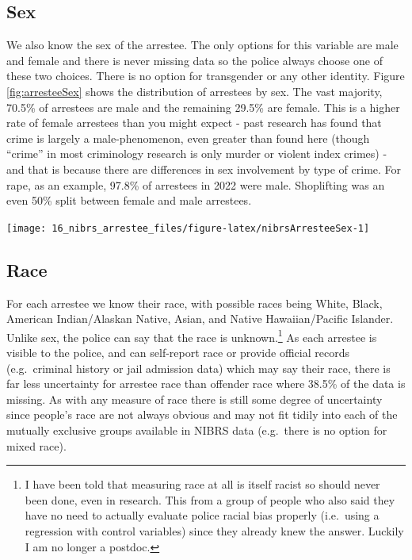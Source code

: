\documentclass[
]{krantz}
\let\origfigure\figure
\let\endorigfigure\endfigure
\renewenvironment{figure}[1][2] {
    \expandafter\origfigure\expandafter[H]
} {
    \endorigfigure
}
\begin{document}
\subsection{Sex}\label{sex-3}

We also know the sex of the arrestee. The only options for
this variable are male and female and there is never missing
data so the police always choose one of these two choices.
There is no option for transgender or any other identity.
Figure \ref{fig:arresteeSex} shows the distribution of
arrestees by sex. The vast majority, 70.5\% of arrestees are
male and the remaining 29.5\% are female. This is a higher
rate of female arrestees than you might expect - past
research has found that crime is largely a male-phenomenon,
even greater than found here (though ``crime'' in most
criminology research is only murder or violent index crimes)
- and that is because there are differences in sex
involvement by type of crime. For rape, as an example,
97.8\% of arrestees in 2022 were male. Shoplifting was an
even 50\% split between female and male arrestees.

\begin{figure}

{\centering \texttt{[image: 16\_nibrs\_arrestee\_files/figure-latex/nibrsArresteeSex-1]} 

}

\caption{The share of arrestees by sex, 1991-2022.}\label{fig:nibrsArresteeSex}
\end{figure}

\subsection{Race}\label{race-4}

For each arrestee we know their race, with possible races
being White, Black, American Indian/Alaskan Native, Asian,
and Native Hawaiian/Pacific Islander. Unlike sex, the police
can say that the race is unknown.\footnote{I have been told
  that measuring race at all is itself racist so should
  never been done, even in research. This from a group of
  people who also said they have no need to actually
  evaluate police racial bias properly (i.e.~using a
  regression with control variables) since they already knew
  the answer. Luckily I am no longer a postdoc.} As each
arrestee is visible to the police, and can self-report race
or provide official records (e.g.~criminal history or jail
admission data) which may say their race, there is far less
uncertainty for arrestee race than offender race where
38.5\% of the data is missing. As with any measure of race
there is still some degree of uncertainty since people's
race are not always obvious and may not fit tidily into each
of the mutually exclusive groups available in NIBRS data
(e.g.~there is no option for mixed race).
\end{document}
